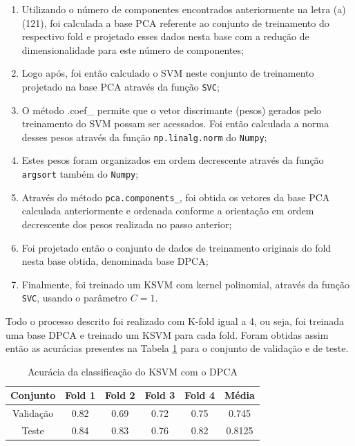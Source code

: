 \documentclass[]{abntex2}
\begin{document}
\begin{enumerate}
    \item Utilizando o número de componentes encontrados anteriormente na letra (a) (121), foi calculada a base PCA referente ao conjunto de treinamento do respectivo fold e projetado esses dados nesta base com a redução de dimensionalidade para este número de componentes;
    \item Logo após, foi então calculado o SVM neste conjunto de treinamento projetado na base PCA através da função \texttt{SVC};
    \item O método {.coef\_} permite que o vetor discrimante (pesos) gerados pelo treinamento do SVM possam ser acessados. Foi então calculada a norma desses pesos através da função \texttt{np.linalg.norm} do \texttt{Numpy};
    \item Estes pesos foram organizados em ordem decrescente através da função \texttt{argsort} também do \texttt{Numpy};
    \item Através do método \texttt{pca.components\_}, foi obtida os vetores da base PCA calculada anteriormente e ordenada conforme a orientação em ordem decrescente dos pesos realizada no passo anterior;
    \item Foi projetado então o conjunto de dados de treinamento originais do fold nesta base obtida, denominada base DPCA;
    \item Finalmente, foi treinado um KSVM com kernel polinomial, através da função \texttt{SVC}, usando o parâmetro $C=1$.
\end{enumerate}

 Todo o processo descrito foi realizado com K-fold igual a 4, ou seja, foi treinada uma base DPCA e treinado um KSVM para cada fold. Foram obtidas assim então as acurácias presentes na Tabela \ref{tab:dpca_ksvm} para o conjunto de validação e de teste.

\begin{table}[H]
    \centering
    \begin{tabular}{|c|c|c|c|c|c|}
    \hline
    \rowcolor[HTML]{C0C0C0} 
    Conjunto                          & Fold 1 & Fold 2 & Fold 3 & Fold 4 & Média  \\ \hline
    \cellcolor[HTML]{C0C0C0}Validação & 0.82   & 0.69  & 0.72   & 0.75   & 0.745  \\ \hline
    \cellcolor[HTML]{C0C0C0}Teste     & 0.84   & 0.83   & 0.76   & 0.82   & 0.8125 \\ \hline
    \end{tabular}
    \caption{Acurácia da classificação do KSVM com o DPCA}
    \label{tab:dpca_ksvm}
\end{table}
\end{document}
